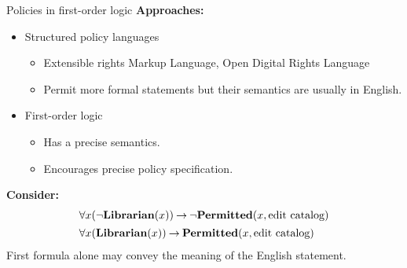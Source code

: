 \begin{wideslide}[bm=,toc=]{Policies in first-order logic}
\textbf{Approaches:}
\begin{itemize}
\item<2-> Structured policy languages
\begin{itemize}
\item<3-> Extensible rights Markup Language, Open Digital Rights Language
\item<4-> Permit more formal statements but their semantics are usually in English.
\end{itemize}
\item<2-> First-order logic 
\begin{itemize}
\item<5-> Has a precise semantics.
\item<6-> Encourages precise policy specification. 
\end{itemize}
\end{itemize}
\pause[6]
\textbf{Consider:}
\vspace{-2mm}
\begin{displaymath}
\begin{array}{l}
\forall x(\neg\mbox{\bf Librarian}(x))\mathbin{\rightarrow} \neg\mbox{\bf Permitted}(x,\mbox{\rm edit catalog}) \\[1ex]
\forall x(\mbox{\bf Librarian}(x))\mathbin{\rightarrow} \mbox{\bf Permitted}(x,\mbox{\rm edit catalog})
\end{array}
\end{displaymath}
\vspace{3mm}
\pause
First formula alone may convey the meaning of the English statement.
\end{wideslide}

